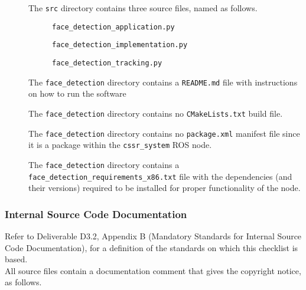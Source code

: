 \documentclass{CSSRforAfrica}
\newcommand{\checkboxChecked}{\fbox{\ding{51}}} %
\begin{document}
\begin{description}
\item[\checkboxChecked] The  {\small \verb+src+} directory contains three source files, named as follows.
\begin{description}
\item[\checkboxChecked] {\small \verb+face_detection_application.py+}  
\item[\checkboxChecked]  {\small \verb+face_detection_implementation.py+}  
\item[\checkboxChecked]  {\small \verb+face_detection_tracking.py+}  
\end{description} 

\item[\checkboxChecked] The {\small \verb+face_detection+} directory contains  a {\small \verb+README.md+} file with  instructions on how to run the software 
\item[\checkboxChecked] The {\small \verb+face_detection+} directory contains  no {\small \verb+CMakeLists.txt+} build file.
\item[\checkboxChecked] The {\small \verb+face_detection+} directory contains  no {\small \verb+package.xml+} manifest file since it is a package within the {\small \verb+cssr_system+} ROS node.
\item[\checkboxChecked] The {\small \verb+face_detection+} directory contains  a {\small \verb+face_detection_requirements_x86.txt+} file with the dependencies (and their versions) required to be installed for proper functionality of the node.

\end{description}


 
 \newpage
\subsubsection{Internal Source Code Documentation}
\label{subsubsection:face_detection_documentation_standards}  
 
Refer to Deliverable D3.2, Appendix B (Mandatory Standards for Internal Source Code Documentation), for a definition of the standards on which this checklist is based.\\

\noindent All source files contain a documentation comment that gives the copyright notice, as follows.
 
\end{document}
